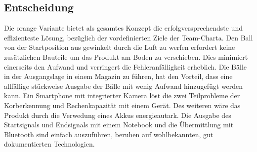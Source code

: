 \subsection{Entscheidung}
Die orange Variante bietet als gesamtes Konzept die erfolgversprechendste und effizienteste Lösung, bezüglich der vordefinierten Ziele der Team-Charta. Den Ball von der Startposition aus gewinkelt durch die Luft zu werfen erfordert keine zusätzlichen Bauteile um das Produkt am Boden zu verschieben. Dies minimiert einerseits den Aufwand und verringert die Fehleranfälligkeit erheblich. Die Bälle in der Ausgangslage in einem Magazin zu führen, hat den Vorteil, dass eine allfällige stückweise Ausgabe der Bälle mit wenig Aufwand hinzugefügt werden kann. Ein Smartphone mit integrierter Kamera löst die zwei Teilprobleme der Korberkennung und Rechenkapazität mit einem Gerät. Des weiteren wäre das Produkt durch die Verwedung eines Akkus energieautark. Die Ausgabe des Startsignals und Endsignals mit einem Notebook und die Übermittlung mit Bluetooth sind einfach auszuführen, beruhen auf wohlbekannten, gut dokumentierten Technologien.